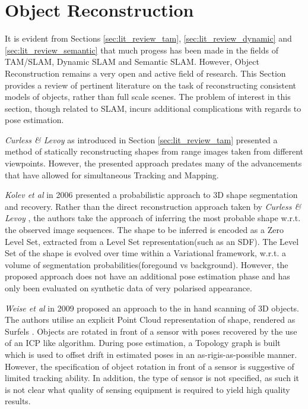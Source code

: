 \section{Object Reconstruction}
\label{sec:lit_review_obj_recon}
It is evident from Sections \ref{sec:lit_review_tam}, \ref{sec:lit_review_dynamic} and 
\ref{sec:lit_review_semantic} that much progess has been made in the fields of TAM/SLAM, 
Dynamic SLAM and Semantic SLAM. However, Object Reconstruction remains a very open and active 
field of research. This Section provides a review of pertinent literature on the task of 
reconstructing consistent models of objects, rather than full scale scenes. The problem of 
interest in this section, though related to SLAM, incurs additional complications with regards 
to pose estimation.

\textit{Curless \& Levoy} \cite{Curless1996} as introduced in Section \ref{sec:lit_review_tam} 
presented a method of statically reconstructing shapes from range images taken from different 
viewpoints. However, the presented approach predates many of the advancements that have allowed 
for simultaneous Tracking and Mapping.

\textit{Kolev et al} \cite{Kolev2006} in 2006 presented a probabilistic approach to 3D shape 
segmentation and recovery. Rather than the direct reconstruction approach taken by 
\textit{Curless \& Levoy} \cite{Curless1996}, the authors take the approach of inferring the most 
probable shape w.r.t. the observed image sequences. The shape to be inferred is encoded as a Zero 
Level Set, extracted from a Level Set representation(such as an SDF). The Level Set of the shape is 
evolved over time within a Variational framework, w.r.t. a volume of segmentation probabilities(foregound 
vs background). However, the proposed approach does not have an additional pose estimation phase and has 
only been evaluated on synthetic data of very polarised appearance.

\textit{Weise et al} \cite{Weise2009} in 2009 proposed an approach to the in hand scanning of 3D objects. 
The authors utilise an explicit Point Cloud representation of shape, rendered as Surfels \cite{Pfister2000}. 
Objects are rotated in front of a sensor with poses recovered by the use of an ICP like algorithm. During 
pose estimation, a Topology graph is built which is used to offset drift in estimated poses in an 
as-rigis-as-possible \cite{ARAP} manner. However, the specification of object rotation in front of a 
sensor is suggestive of limited tracking ability. In addition, the type of sensor is not specified, 
as such it is not clear what quality of sensing equipment is required to yield high quality results.

